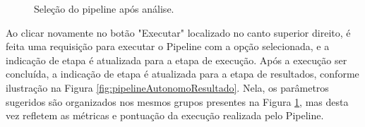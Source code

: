 \documentclass[portugues]{ic-tese}
\begin{document}
\begin{figure}[H]
    \centering
    \caption{Seleção do pipeline após análise.}
    \label{fig:pipelineAutonomoSelecao}
\end{figure}

Ao clicar novamente no botão "Executar" localizado no canto superior direito, é feita uma requisição para executar o Pipeline com a opção selecionada, e a indicação de etapa é atualizada para a etapa de execução. Após a execução ser concluída,  a indicação de etapa é atualizada para a etapa de resultados, conforme ilustração na Figura \ref{fig:pipelineAutonomoResultado}. Nela, os parâmetros sugeridos são organizados nos mesmos grupos presentes na Figura \ref{fig:pipelineAutonomoSelecao}, mas desta vez refletem as métricas e pontuação da execução realizada pelo Pipeline.
\end{document}

